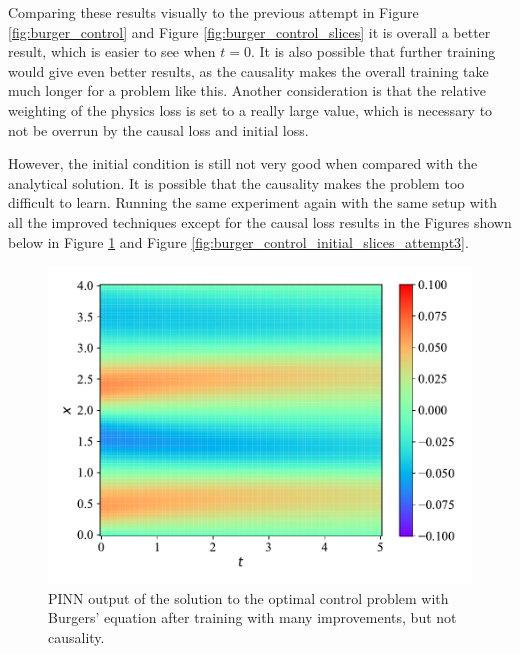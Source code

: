 Comparing these results visually to the previous attempt in Figure \ref{fig:burger_control} and Figure \ref{fig:burger_control_slices} it is overall a better result, which is easier to see when $t = 0$. It is also possible that further training would give even better results, as the causality makes the overall training take much longer for a problem like this. Another consideration is that the relative weighting of the physics loss is set to a really large value, which is necessary to not be overrun by the causal loss and initial loss.

However, the initial condition is still not very good when compared with the analytical solution. It is possible that the causality makes the problem too difficult to learn. Running the same experiment again with the same setup with all the improved techniques except for the causal loss results in the Figures shown below in Figure \ref{fig:burger_control_initial_attempt3} and Figure \ref{fig:burger_control_initial_slices_attempt3}.

\begin{figure}[H]
    \centering
    \includegraphics[width=1.0\linewidth]{Figures/AdvancedExperiments/InitialControlCausal/attempt3/burger.pdf}
    \caption{PINN output of the solution to the optimal control problem with Burgers' equation after training with many improvements, but not causality.}
    \label{fig:burger_control_initial_attempt3}
\end{figure}

